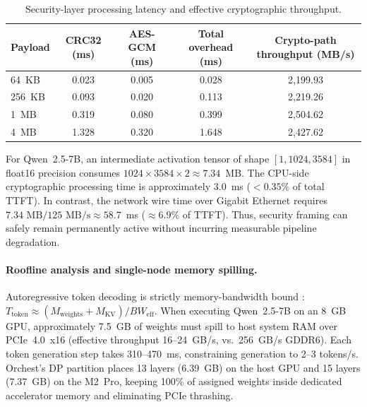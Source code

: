 \documentclass[10pt,a4paper]{article}
\begin{document}
\begin{table}[H]
\centering\footnotesize
\caption{Security-layer processing latency and effective cryptographic throughput.}
\begin{tabular}{@{}lcccc@{}}
\toprule
Payload & CRC32 (ms) & AES-GCM (ms) & Total overhead (ms) & Crypto-path throughput (MB/s)\\
\midrule
64~KB & 0.023 & 0.005 & 0.028 & 2{,}199.93\\
256~KB & 0.093 & 0.020 & 0.113 & 2{,}219.26\\
1~MB & 0.319 & 0.080 & 0.399 & 2{,}504.62\\
4~MB & 1.328 & 0.320 & 1.648 & 2{,}427.62\\
\bottomrule
\end{tabular}
\end{table}

For Qwen~2.5-7B, an intermediate activation tensor of shape $[1, 1024, 3584]$ in float16 precision consumes $1024 \times 3584 \times 2 \approx 7.34$~MB. The CPU-side cryptographic processing time is approximately 3.0~ms ($<0.35\%$ of total TTFT). In contrast, the network wire time over Gigabit Ethernet requires $7.34\text{~MB} / 125\text{~MB/s} \approx 58.7$~ms ($\approx 6.9\%$ of TTFT). Thus, security framing can safely remain permanently active without incurring measurable pipeline degradation.

\paragraph{Roofline analysis and single-node memory spilling.}
Autoregressive token decoding is strictly memory-bandwidth bound \cite{roofline}: $T_{\text{token}} \approx (M_{\text{weights}} + M_{\text{KV}}) / BW_{\text{eff}}$. When executing Qwen~2.5-7B on an 8~GB GPU, approximately 7.5~GB of weights must spill to host system RAM over PCIe~4.0~x16 (effective throughput 16--24~GB/s, vs.\ 256~GB/s GDDR6). Each token generation step takes 310--470~ms, constraining generation to 2--3 tokens/s. Orchest's DP partition places 13 layers (6.39~GB) on the host GPU and 15 layers (7.37~GB) on the M2~Pro, keeping 100\% of assigned weights inside dedicated accelerator memory and eliminating PCIe thrashing.
\end{document}
